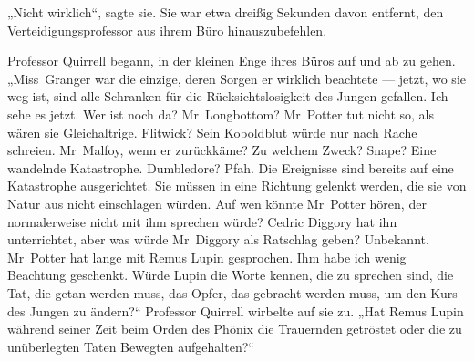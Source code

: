 „Nicht wirklich“, sagte sie. Sie war etwa dreißig Sekunden davon entfernt, den Verteidigungsprofessor aus ihrem Büro hinauszubefehlen.

Professor Quirrell begann, in der kleinen Enge ihres Büros auf und ab zu gehen.
„Miss~Granger war die einzige, deren Sorgen er wirklich beachtete — jetzt, wo sie weg ist, sind alle Schranken für die Rücksichtslosigkeit des Jungen gefallen. Ich sehe es jetzt. Wer ist noch da? Mr~Longbottom? Mr~Potter tut nicht so, als wären sie Gleichaltrige. Flitwick? Sein Koboldblut würde nur nach Rache schreien. Mr~Malfoy, wenn er zurückkäme? Zu welchem Zweck? Snape? Eine wandelnde Katastrophe. Dumbledore? Pfah. Die Ereignisse sind bereits auf eine Katastrophe ausgerichtet. Sie müssen in eine Richtung gelenkt werden, die sie von Natur aus nicht einschlagen würden. Auf wen könnte Mr~Potter hören, der normalerweise nicht mit ihm sprechen würde? Cedric Diggory hat ihn unterrichtet, aber was würde Mr~Diggory als Ratschlag geben? Unbekannt. Mr~Potter hat lange mit Remus Lupin gesprochen. Ihm habe ich wenig Beachtung geschenkt. Würde Lupin die Worte kennen, die zu sprechen sind, die Tat, die getan werden muss, das Opfer, das gebracht werden muss, um den Kurs des Jungen zu ändern?“
Professor Quirrell wirbelte auf sie zu.
„Hat Remus Lupin während seiner Zeit beim Orden des Phönix die Trauernden getröstet oder die zu unüberlegten Taten Bewegten aufgehalten?“


